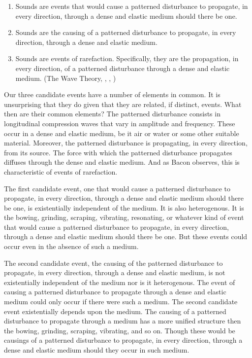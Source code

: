 \documentclass[12pt]{article}
\begin{document}
\begin{enumerate}
	\item Sounds are events that would cause a patterned disturbance to propagate, in every direction, through a dense and elastic medium should there be one. \citep{Casati:1994aa}
	\item Sounds are the causing of a patterned disturbance to propagate, in every direction, through a dense and elastic medium. \citep{OCallaghan:2007xy}
	\item Sounds are events of rarefaction. Specifically, they are the propagation, in every direction, of a patterned disturbance through a dense and elastic medium. (The Wave Theory, \citealt{OShaughnessy:2009aa}, \citealt{Sorensen:2009aa}, \citealt[chapters 3–4]{Kalderon:2018oe})
\end{enumerate}
Our three candidate events have a number of elements in common. It is unsurprising that they do given that they are related, if distinct, events. What then are their common elements? The patterned disturbance consists in longitudinal compression waves that vary in amplitude and frequency. These occur in a dense and elastic medium, be it air or water or some other suitable material. Moreover, the patterned disturbance is propagating, in every direction, from its source. The force with which the patterned disturbance propagates diffuses through the dense and elastic medium. And as Bacon observes, this is characteristic of events of rarefaction.

The first candidate event, one that would cause a patterned disturbance to propagate, in every direction, through a dense and elastic medium should there be one, is existentially independent of the medium. It is also heterogenous. It is the bowing, grinding, scraping, vibrating, resonating, or whatever kind of event that would cause a patterned disturbance to propagate, in every direction, through a dense and elastic medium should there be one. But these events could occur even in the absence of such a medium.

The second candidate event, the causing of the patterned disturbance to propagate, in every direction, through a dense and elastic medium, is not existentially independent of the medium nor is it heterogenous. The event of causing a patterned disturbance to propagate through a dense and elastic medium could only occur if there were such a medium. The second candidate event existentially depends upon the medium. The causing of a patterned disturbance to propagate through a medium has a more unified structure then the bowing, grinding, scraping, vibrating, and so on. Though these would be causings of a patterned disturbance to propagate, in every direction, through a dense and elastic medium should they occur in such medium.
\end{document}
